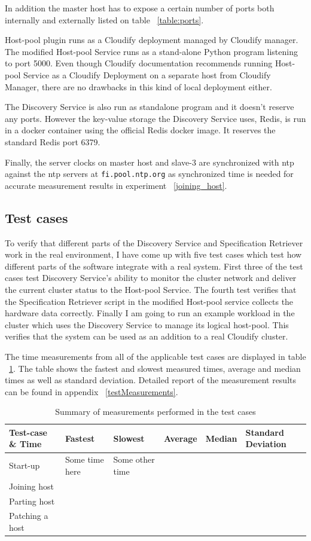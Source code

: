 In addition the master host has to expose a certain number of ports both internally and externally listed on table ~\ref{table:ports}.

Host-pool plugin runs as a Cloudify deployment managed by Cloudify manager. The modified Host-pool Service runs as a stand-alone Python program listening to port 5000. Even though Cloudify documentation recommends running Host-pool Service as a Cloudify Deployment on a separate host from Cloudify Manager, there are no drawbacks in this kind of local deployment either. 

The Discovery Service is also run as standalone program and it doesn't reserve any ports. However the key-value storage the Discovery Service uses, Redis, is run in a docker container using the official Redis docker image. It reserves the standard  Redis port 6379.

Finally, the server clocks on master host and slave-3 are synchronized with ntp against the ntp servers at \verb|fi.pool.ntp.org| as synchronized time is needed for accurate measurement results in experiment ~\ref{joining_host}.
  

\subsection{Test cases}

To verify that different parts of the Discovery Service and Specification Retriever work in the real environment, I have come up with five test cases which test how different parts of the software integrate with a real system. First three of the test cases test Discovery Service's ability to monitor  the cluster network and deliver the current cluster status to the Host-pool Service. The fourth test verifies that the Specification Retriever script in the modified Host-pool service collects the hardware data correctly. Finally I am going to run an example workload in the cluster which uses the Discovery Service to manage its logical host-pool. This verifies that the system can be used as an addition to a real Cloudify cluster.

The time measurements from all of the applicable test cases are displayed in table ~\ref{table:measurements}. The table shows the fastest and slowest measured times, average and median times as well as standard deviation. Detailed report of the measurement results can be found in appendix ~\ref{testMeasurements}.

\begin{table}
\centering
\begin{tabular}{ | l || l | l | l | l | l |}
\hline 
Test-case \& Time & Fastest & Slowest & Average & Median & Standard Deviation \\
\hline \hline
Start-up & Some time here & Some other time \\
\hline
Joining host \\
\hline
Parting host \\
\hline
Patching a host \\
\hline
\end{tabular}
\caption{Summary of measurements performed in the test cases}
\label{table:measurements}
\end{table}

